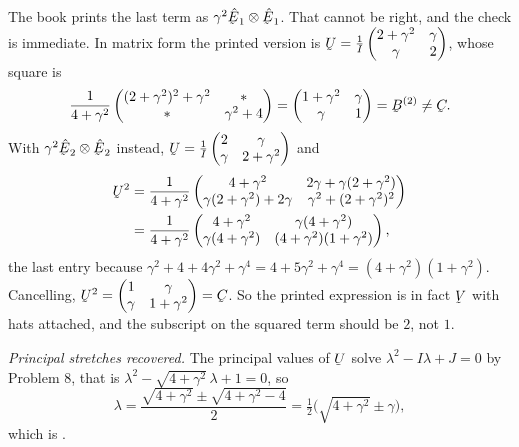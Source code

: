 \begin{solution}
\begin{remark}\label{rem:p9misprint}
The book prints the last term as $\gamma^{2}\hbE_{1}\otimes\hbE_{1}$. That
cannot be right, and the check is immediate. In matrix form the printed
version is $\bU=\tfrac1I\begin{pmatrix}2+\gamma^{2}&\gamma\\ \gamma&2
\end{pmatrix}$, whose square is
\[
   \frac{1}{4+\gamma^{2}}
   \begin{pmatrix}(2+\gamma^{2})^{2}+\gamma^{2}&\ast\\ \ast&
   \gamma^{2}+4\end{pmatrix}
   =\begin{pmatrix}1+\gamma^{2}&\gamma\\ \gamma&1\end{pmatrix}
   =\bB^{(2)}\neq\bC .
\]
With $\gamma^{2}\hbE_{2}\otimes\hbE_{2}$ instead,
$\bU=\tfrac1I\begin{pmatrix}2&\gamma\\ \gamma&2+\gamma^{2}\end{pmatrix}$
and
\[
\begin{aligned}
   \bU^{2}&=\frac{1}{4+\gamma^{2}}
   \begin{pmatrix}4+\gamma^{2}&2\gamma+\gamma(2+\gamma^{2})\\
   \gamma(2+\gamma^{2})+2\gamma&\gamma^{2}+(2+\gamma^{2})^{2}
   \end{pmatrix}\\
   &=\frac{1}{4+\gamma^{2}}
   \begin{pmatrix}4+\gamma^{2}&\gamma(4+\gamma^{2})\\
   \gamma(4+\gamma^{2})&(4+\gamma^{2})(1+\gamma^{2})\end{pmatrix},
\end{aligned}
\]
the last entry because
$\gamma^{2}+4+4\gamma^{2}+\gamma^{4}=4+5\gamma^{2}+\gamma^{4}
=(4+\gamma^{2})(1+\gamma^{2})$. Cancelling,
$\bU^{2}=\begin{pmatrix}1&\gamma\\ \gamma&1+\gamma^{2}\end{pmatrix}=\bC$.
So the printed expression is in fact $\bV$ with hats attached, and the
subscript on the squared term should be $2$, not $1$.
\end{remark}

\emph{Principal stretches recovered.} The principal values of $\bU$ solve
$\lambda^{2}-I\lambda+J=0$ by Problem 8, that is
$\lambda^{2}-\sqrt{4+\gamma^{2}}\,\lambda+1=0$, so
\[
   \lambda=\frac{\sqrt{4+\gamma^{2}}\pm\sqrt{4+\gamma^{2}-4}}{2}
          =\tfrac12\big(\sqrt{4+\gamma^{2}}\pm\gamma\big),
\]
which is .


\end{solution}
